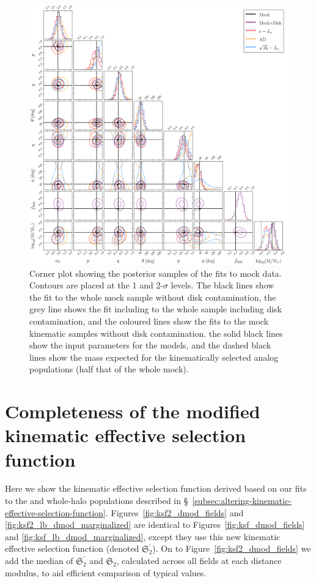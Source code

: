 \begin{figure}
    \centering
    \includegraphics[width=\halftextwidth]{figure/ch3/mock_posterior.pdf}
    \caption{Corner plot showing the posterior samples of the fits to mock data. Contours are placed at the 1 and 2-$\sigma$ levels. The black lines show the fit to the whole mock sample without disk contamination, the grey line shows the fit including to the whole sample including disk contamination, and the coloured lines show the fits to the mock \gse kinematic samples without disk contamination. the solid black lines show the input parameters for the models, and the dashed black lines show the mass expected for the kinematically selected \gse analog populations (half that of the whole mock).}
    \label{fig:mock_posterior}
\end{figure}

\section{Completeness of the modified kinematic effective selection function}
\label{ap:modified-ksf}

Here we show the kinematic effective selection function derived based on our fits to the \gse and whole-halo populations described in \S~\ref{subsec:altering-kinematic-effective-selection-function}. Figures~\ref{fig:ksf2_dmod_fields} and \ref{fig:ksf2_lb_dmod_marginalized} are identical to Figures~\ref{fig:ksf_dmod_fields} and \ref{fig:ksf_lb_dmod_marginalized}, except they use this new kinematic effective selection function (denoted $\mathfrak{S}_{2}^{\prime}$). On to Figure~\ref{fig:ksf2_dmod_fields} we add the median of $\mathfrak{S}_{2}^{\prime}$ and $\mathfrak{S}_{2}$, calculated across all fields at each distance modulus, to aid efficient comparison of typical values.

